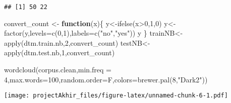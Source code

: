 \documentclass[
]{article}
\newenvironment{Shaded}{\begin{snugshade}}{\end{snugshade}}
\newcommand{\AttributeTok}[1]{\textcolor[rgb]{0.77,0.63,0.00}{#1}}
\newcommand{\ControlFlowTok}[1]{\textcolor[rgb]{0.13,0.29,0.53}{\textbf{#1}}}
\newcommand{\DecValTok}[1]{\textcolor[rgb]{0.00,0.00,0.81}{#1}}
\newcommand{\FunctionTok}[1]{\textcolor[rgb]{0.00,0.00,0.00}{#1}}
\newcommand{\NormalTok}[1]{#1}
\newcommand{\OtherTok}[1]{\textcolor[rgb]{0.56,0.35,0.01}{#1}}
\newcommand{\SpecialCharTok}[1]{\textcolor[rgb]{0.00,0.00,0.00}{#1}}
\newcommand{\StringTok}[1]{\textcolor[rgb]{0.31,0.60,0.02}{#1}}
\begin{document}
\begin{verbatim}
## [1] 50 22
\end{verbatim}

\begin{Shaded}
\begin{Highlighting}[]
\NormalTok{convert\_count }\OtherTok{\textless{}{-}} \ControlFlowTok{function}\NormalTok{(x)\{}
\NormalTok{    y}\OtherTok{\textless{}{-}}\FunctionTok{ifelse}\NormalTok{(x}\SpecialCharTok{\textgreater{}}\DecValTok{0}\NormalTok{,}\DecValTok{1}\NormalTok{,}\DecValTok{0}\NormalTok{)}
\NormalTok{    y}\OtherTok{\textless{}{-}}\FunctionTok{factor}\NormalTok{(y,}\AttributeTok{levels=}\FunctionTok{c}\NormalTok{(}\DecValTok{0}\NormalTok{,}\DecValTok{1}\NormalTok{),}\AttributeTok{labels=}\FunctionTok{c}\NormalTok{(}\StringTok{"no"}\NormalTok{,}\StringTok{"yes"}\NormalTok{))}
\NormalTok{    y}
\NormalTok{\}}
\NormalTok{trainNB}\OtherTok{\textless{}{-}}\FunctionTok{apply}\NormalTok{(dtm.train.nb,}\DecValTok{2}\NormalTok{,convert\_count)}
\NormalTok{testNB}\OtherTok{\textless{}{-}}\FunctionTok{apply}\NormalTok{(dtm.test.nb,}\DecValTok{1}\NormalTok{,convert\_count)}

\FunctionTok{wordcloud}\NormalTok{(corpus.clean,}\AttributeTok{min.freq =} \DecValTok{4}\NormalTok{,}\AttributeTok{max.words=}\DecValTok{100}\NormalTok{,}\AttributeTok{random.order=}\NormalTok{F,}\AttributeTok{colors=}\FunctionTok{brewer.pal}\NormalTok{(}\DecValTok{8}\NormalTok{,}\StringTok{"Dark2"}\NormalTok{))}
\end{Highlighting}
\end{Shaded}

\texttt{[image: projectAkhir\_files/figure-latex/unnamed-chunk-6-1.pdf]}
\end{document}
